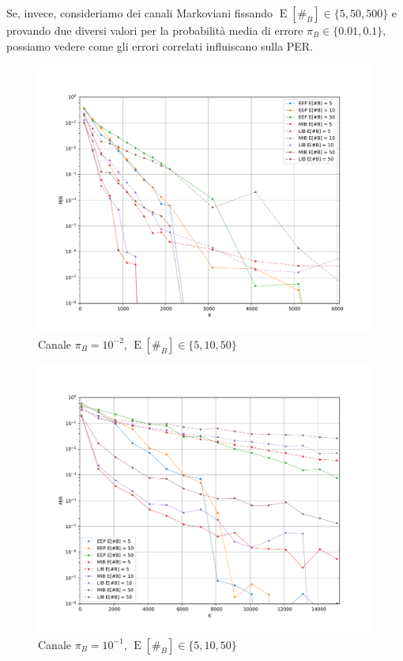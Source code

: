 \documentclass[italian, a4paper, 12pt]{article}
\newcommand{\E}[1]{\operatorname{E}\left[#1\right]}
\newcommand{\EnB}{\E{\#_B}}
\begin{document}
Se, invece, consideriamo dei canali Markoviani fissando $\EnB \in
\{5,50,500\}$ e provando due diversi valori per la probabilità media
di errore $\pi_B \in \{0.01, 0.1\}$, possiamo vedere come gli errori
correlati influiscano sulla PER.
%
\begin{figure}[H]
  \centering
  \includegraphics[width=\textwidth]{plot_markov_pi100small}
  \caption{Canale $\pi_B = 10^{-2}$, $\EnB \in \{5, 10, 50\}$}
  \label{fig:markov_pi100small}
\end{figure}
\begin{figure}[H]
  \centering
  \includegraphics[width=\textwidth]{plot_markov_pi10small}
  \caption{Canale $\pi_B = 10^{-1}$, $\EnB \in \{5, 10, 50\}$}
  \label{fig:markov_pi10small}
\end{figure}
\end{document}
